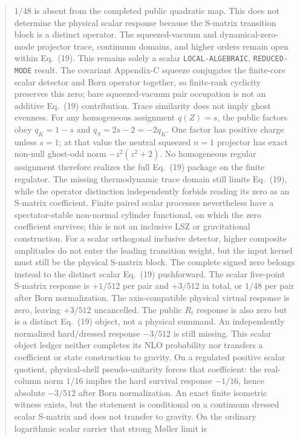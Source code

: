 \documentclass[11pt]{article}
\theoremstyle{definition}
\theoremstyle{remark}
\begin{document}
\begin{abstract}
$1/48$ is absent from the completed public quadratic
map.  This does not determine the physical scalar response because the
S-matrix transition block is a distinct operator.  The squeezed-vacuum and
dynamical-zero-mode projector trace, continuum domains, and higher orders
remain open within Eq.~(19).
This remains solely a scalar \texttt{LOCAL-ALGEBRAIC},
\texttt{REDUCED-MODE} result.
The covariant Appendix-C squeeze conjugates the finite-core scalar detector
and Born operator together, so finite-rank cyclicity preserves this zero; bare
squeezed-vacuum pair occupation is not an additive Eq.~(19) contribution.
Trace similarity does not imply ghost evenness.  For any homogeneous
assignment $q(Z)=s$, the public factors obey
$q_K=1-s$ and $q_S=2s-2=-2q_K$.  One factor has positive charge unless
$s=1$; at that value the neutral squeezed $n=1$ projector has exact non-null
ghost-odd norm $-z^2(z^2+2)$.  No homogeneous regular assignment therefore
realizes the full Eq.~(19) package on the finite regulator.  The missing
thermodynamic trace domain still limits Eq.~(19), while the
operator distinction independently forbids reading its zero as an S-matrix
coefficient.
Finite paired scalar processes nevertheless have a spectator-stable
non-normal cylinder functional, on which the zero coefficient survives; this
is not an inclusive LSZ or gravitational construction.
For a scalar orthogonal inclusive detector, higher composite amplitudes do not
enter the leading transition weight, but the input kernel must still be the
physical S-matrix block.  The complete signed zero belongs instead to the
distinct scalar Eq.~(19) pushforward.  The scalar five-point S-matrix response
is $+1/512$ per pair and $+3/512$ in total, or $1/48$ per pair after Born
normalization.  The axis-compatible physical virtual response is zero, leaving
$+3/512$ uncancelled.  The public $R_t$ response is also zero but is a distinct
Eq.~(19) object, not a physical summand.  An independently normalized
hard/dressed response $-3/512$ is still missing.  This scalar object ledger
neither completes its NLO probability nor transfers a coefficient or state
construction to gravity.
On a regulated positive scalar quotient, physical-shell pseudo-unitarity
forces that coefficient: the real-column norm $1/16$ implies the hard survival
response $-1/16$, hence absolute $-3/512$ after Born normalization.  An exact
finite isometric witness exists, but the statement is conditional on a
continuum dressed scalar S-matrix and does not transfer to gravity.
On the ordinary logarithmic scalar carrier that strong Møller limit is

\end{abstract}
\end{document}

